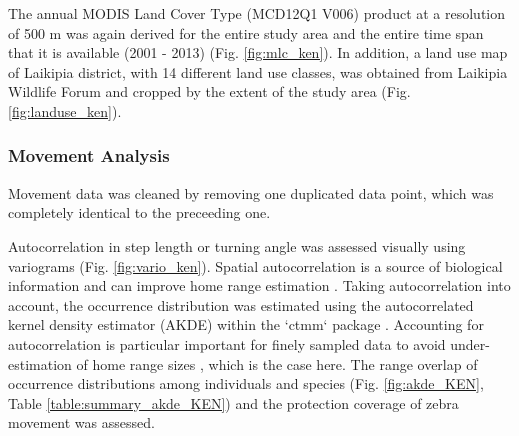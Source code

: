 \documentclass[12pt,a4paper, twoside, english]{article}
\begin{document}
The annual MODIS Land Cover Type (MCD12Q1 V006) product at a resolution of 500 m was again derived for the entire study area and the entire time span that it is available (2001 - 2013) (Fig. \ref{fig:mlc_ken}). In addition, a land use map of Laikipia district, with 14 different land use classes, was obtained from Laikipia Wildlife Forum and cropped by the extent of the study area (Fig. \ref{fig:landuse_ken}).

\subsubsection{Movement Analysis}

Movement data was cleaned by removing one duplicated data point, which was completely identical to the preceeding one. 



Autocorrelation in step length or turning angle was assessed visually using variograms (Fig. \ref{fig:vario_ken}). Spatial autocorrelation is a source of biological information and can improve home range estimation \citep{DeSolla1999}. Taking autocorrelation into account, the occurrence distribution was estimated using the autocorrelated kernel density estimator (AKDE) within the `ctmm` package \citep{Fleming2016}. Accounting for autocorrelation is particular important for finely sampled data to avoid under-estimation of home range sizes \citep{Fleming2015a}, which is the case here. The range overlap of occurrence distributions among individuals and species (Fig. \ref{fig:akde_KEN}, Table \ref{table:summary_akde_KEN}) and the protection coverage of zebra movement was assessed.
\end{document}

